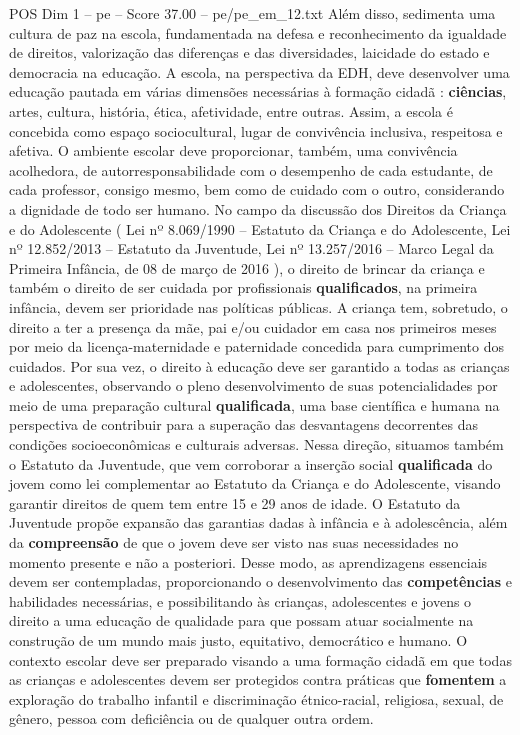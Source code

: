 \begin{textsample}{POS Dim 1 – pe – Score 37.00 – pe/pe\_em\_12.txt}
Além disso, sedimenta uma cultura de paz na escola, fundamentada na defesa e reconhecimento da igualdade de direitos, valorização das diferenças e das diversidades, laicidade do estado e democracia na educação.
A escola, na perspectiva da EDH, deve desenvolver uma educação pautada em várias dimensões necessárias à formação cidadã : \textbf{ciências}, artes, cultura, história, ética, afetividade, entre outras.
Assim, a escola é concebida como espaço sociocultural, lugar de convivência inclusiva, respeitosa e afetiva.
O ambiente escolar deve proporcionar, também, uma convivência acolhedora, de autorresponsabilidade com o desempenho de cada estudante, de cada professor, consigo mesmo, bem como de cuidado com o outro, considerando a dignidade de todo ser humano.
No campo da discussão dos Direitos da Criança e do Adolescente ( Lei nº 8.069/1990 – Estatuto da Criança e do Adolescente, Lei nº 12.852/2013 – Estatuto da Juventude, Lei nº 13.257/2016 – Marco Legal da Primeira Infância, de 08 de março de 2016 ), o direito de brincar da criança e também o direito de ser cuidada por profissionais \textbf{qualificados}, na primeira infância, devem ser prioridade nas políticas públicas.
A criança tem, sobretudo, o direito a ter a presença da mãe, pai e/ou cuidador em casa nos primeiros meses por meio da licença-maternidade e paternidade concedida para cumprimento dos cuidados.
Por sua vez, o direito à educação deve ser garantido a todas as crianças e adolescentes, observando o pleno desenvolvimento de suas potencialidades por meio de uma preparação cultural \textbf{qualificada}, uma base científica e humana na perspectiva de contribuir para a superação das desvantagens decorrentes das condições socioeconômicas e culturais adversas.
Nessa direção, situamos também o Estatuto da Juventude, que vem corroborar a inserção social \textbf{qualificada} do jovem como lei complementar ao Estatuto da Criança e do Adolescente, visando garantir direitos de quem tem entre 15 e 29 anos de idade.
O Estatuto da Juventude propõe expansão das garantias dadas à infância e à adolescência, além da \textbf{compreensão} de que o jovem deve ser visto nas suas necessidades no momento presente e não a posteriori.
Desse modo, as aprendizagens essenciais devem ser contempladas, proporcionando o desenvolvimento das \textbf{competências} e habilidades necessárias, e possibilitando às crianças, adolescentes e jovens o direito a uma educação de qualidade para que possam atuar socialmente na construção de um mundo mais justo, equitativo, democrático e humano.
O contexto escolar deve ser preparado visando a uma formação cidadã em que todas as crianças e adolescentes devem ser protegidos contra práticas que \textbf{fomentem} a exploração do trabalho infantil e discriminação étnico-racial, religiosa, sexual, de gênero, pessoa com deficiência ou de qualquer outra ordem.

\end{textsample}
